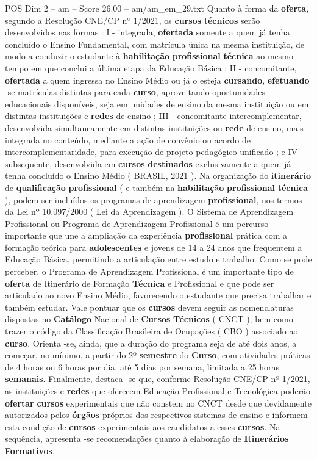 \begin{textsample}{POS Dim 2 – am – Score 26.00 – am/am\_em\_29.txt}
Quanto à forma da \textbf{oferta}, segundo a Resolução CNE/CP nº 1/2021, os \textbf{cursos} \textbf{técnicos} serão desenvolvidos nas formas : I - integrada, \textbf{ofertada} somente a quem já tenha concluído o Ensino Fundamental, com matrícula única na mesma instituição, de modo a conduzir o estudante à \textbf{habilitação} \textbf{profissional} \textbf{técnica} ao mesmo tempo em que conclui a última etapa da Educação Básica ; II - concomitante, \textbf{ofertada} a quem ingressa no Ensino Médio ou já o esteja \textbf{cursando}, \textbf{efetuando} -se matrículas distintas para cada \textbf{curso}, aproveitando oportunidades educacionais disponíveis, seja em unidades de ensino da mesma instituição ou em distintas instituições e \textbf{redes} de ensino ; III - concomitante intercomplementar, desenvolvida simultaneamente em distintas instituições ou \textbf{rede} de ensino, mais integrada no conteúdo, mediante a ação de convênio ou acordo de intercomplementaridade, para execução de projeto pedagógico unificado ; e IV - subsequente, desenvolvida em \textbf{cursos} \textbf{destinados} exclusivamente a quem já tenha concluído o Ensino Médio ( BRASIL, 2021 ).
Na organização do \textbf{itinerário} de \textbf{qualificação} \textbf{profissional} ( e também na \textbf{habilitação} \textbf{profissional} \textbf{técnica} ), podem ser incluídos os programas de aprendizagem \textbf{profissional}, nos termos da Lei nº 10.097/2000 ( Lei da Aprendizagem ).
O Sistema de Aprendizagem Profissional ou Programa de Aprendizagem Profissional é um percurso importante que une a ampliação da experiência \textbf{profissional} prática com a formação teórica para \textbf{adolescentes} e jovens de 14 a 24 anos que frequentem a Educação Básica, permitindo a articulação entre estudo e trabalho.
Como se pode perceber, o Programa de Aprendizagem Profissional é um importante tipo de \textbf{oferta} de Itinerário de Formação \textbf{Técnica} e Profissional e que pode ser articulado ao novo Ensino Médio, favorecendo o estudante que precisa trabalhar e também estudar.
Vale pontuar que os \textbf{cursos} devem seguir as nomenclaturas dispostas no \textbf{Catálogo} Nacional de \textbf{Cursos} \textbf{Técnicos} ( CNCT ), bem como trazer o código da Classificação Brasileira de Ocupações ( CBO ) associado ao \textbf{curso}.
Orienta -se, ainda, que a duração do programa seja de até dois anos, a começar, no mínimo, a partir do 2º \textbf{semestre} do \textbf{Curso}, com atividades práticas de 4 horas ou 6 horas por dia, até 5 dias por semana, limitada a 25 horas \textbf{semanais}.
Finalmente, destaca -se que, conforme Resolução CNE/CP nº 1/2021, as instituições e \textbf{redes} que oferecem Educação Profissional e Tecnológica poderão \textbf{ofertar} \textbf{cursos} experimentais que não constem no CNCT desde que devidamente autorizados pelos \textbf{órgãos} próprios dos respectivos sistemas de ensino e informem esta condição de \textbf{cursos} experimentais aos candidatos a esses \textbf{cursos}.
Na sequência, apresenta -se recomendações quanto à elaboração de \textbf{Itinerários} \textbf{Formativos}.


\end{textsample}

